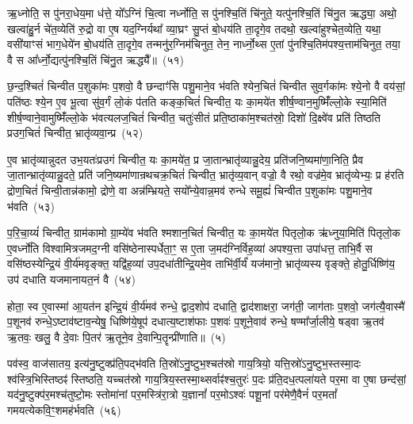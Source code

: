 ऋ॒ध्नोति॒ स पु॑नरा॒धेय॒मा ध॑त्ते॒ यो᳚\-ऽग्निं चि॒त्वा नर्ध्नोति॒ स पु॑नश्चि॒तिं चि॑नुते॒ यत्पु॑नश्चि॒तिं चि॑नु॒त ऋद्ध्या॒ अथो॒ खल्वा॑हु॒र्न चे॑त॒व्येति॑ रु॒द्रो वा ए॒ष यद॒ग्निर्यथा᳚ व्या॒घ्रꣳ सु॒प्तं बो॒धय॑ति ता॒दृगे॒व तदथो॒ खल्वा॑हुश्चेत॒व्येति॒ यथा॒ वसी॑याꣳसं भाग॒धेये॑न बो॒धय॑ति ता॒दृगे॒व तन्मनु॑र॒ग्निम॑चिनुत॒ तेन॒ नार्ध्नो॒थ्स ए॒तां पु॑नश्चि॒तिम॑पश्य॒त्ताम॑चिनुत॒ तया॒ वै स आ᳚र्ध्नो॒द्यत्पु॑नश्चि॒तिं चि॑नु॒त ऋद्ध्यै᳚॥~(५१)

{\anuvakamend[{त्रि॒वृदथ॒ तिष्ठ॑न्त्यग्न्या॒धेये॑न॒ नाचि॑नुत स॒प्तद॑श च}]}%

छ॒न्द॒श्चितं॑ चिन्वीत प॒शुका॑मः प॒शवो॒ वै छन्दाꣳ॑सि पशु॒माने॒व भ॑वति श्येन॒चितं॑ चिन्वीत सुव॒र्गका॑मः श्ये॒नो वै वय॑सां॒ पति॑ष्ठः श्ये॒न ए॒व भू॒त्वा सु॑व॒र्गं लो॒कं प॑तति कङ्क॒चितं॑ चिन्वीत॒ यः का॒मये॑त शीर्\mbox{}ष॒ण्वान॒मुष्मिँ॑ल्लो॒के स्या॒मिति॑ शीर्\mbox{}ष॒ण्वाने॒वामुष्मिँ॑ल्लो॒के भ॑वत्यलज॒चितं॑ चिन्वीत॒ चतुः॑सीतं प्रति॒ष्ठाका॑म॒श्चत॑स्रो॒ दिशो॑ दि॒क्ष्वे॑व प्रति॑ तिष्ठति प्रउग॒चितं॑ चिन्वीत॒ भ्रातृ॑व्यवा॒न्प्र~(५२)

ए॒व भ्रातृ॑व्यान्नुदत उभ॒यतः॑प्रउगं चिन्वीत॒ यः का॒मये॑त॒ प्र जा॒तान्भ्रातृ॑व्यान्नु॒देय॒ प्रति॑जनि॒ष्यमा॑णा॒निति॒ प्रैव जा॒तान्भ्रातृ॑व्यान्नु॒दते॒ प्रति॑ जनि॒ष्यमा॑णान्रथचक्र॒चितं॑ चिन्वीत॒ भ्रातृ॑व्य॒वान् वज्रो॒ वै रथो॒ वज्र॑मे॒व भ्रातृ॑व्येभ्यः॒ प्र ह॑रति द्रोण॒चितं॑ चिन्वी॒तान्न॑कामो॒ द्रोणे॒ वा अन्न॑म्भ्रियते॒ सयो᳚न्ये॒वान्न॒मव॑ रुन्धे समू॒ह्यं॑ चिन्वीत प॒शुका॑मः पशु॒माने॒व भ॑वति~(५३)

प॒रि॒चा॒य्यं॑ चिन्वीत॒ ग्राम॑कामो ग्रा॒म्ये॑व भ॑वति श्मशान॒चितं॑ चिन्वीत॒ यः का॒मये॑त पितृलो॒क ऋ॑ध्नुया॒मिति॑ पितृलो॒क ए॒वर्ध्नो॑ति विश्वामित्रजमद॒ग्नी वसि॑ष्ठेनास्पर्धेता॒ꣳ॒ स ए॒ता ज॒मद॑ग्निर्विह॒व्या॑ अपश्य॒त्ता उपा॑धत्त॒ ताभि॒र्वै स वसि॑ष्ठस्येन्द्रि॒यं वी॒र्य॑मवृङ्क्त॒ यद्वि॑ह॒व्या॑ उप॒दधा॑तीन्द्रि॒यमे॒व ताभि॑र्वी॒र्यं॑ यज॑मानो॒ भ्रातृ॑व्यस्य वृङ्क्ते॒ होतु॒र्धिष्णि॑य॒ उप॑ दधाति यजमानायत॒नं वै~(५४)

होता॒ स्व ए॒वास्मा॑ आ॒यत॑न इन्द्रि॒यं वी॒र्य॑मव॑ रुन्धे॒ द्वाद॒शोप॑ दधाति॒ द्वाद॑शाक्षरा॒ जग॑ती॒ जाग॑ताः प॒शवो॒ जग॑त्यै॒वास्मै॑ प॒शूनव॑ रुन्धे॒\-ऽष्टाव॑ष्टाव॒न्येषु॒ धिष्णि॑ये॒षूप॑ दधात्य॒ष्टाश॑फाः प॒शवः॑ प॒शूने॒वाव॑ रुन्धे॒ षण्मा᳚र्जा॒लीये॒ षड्वा ऋ॒तव॑ ऋ॒तवः॒ खलु॒ वै दे॒वाः पि॒तर॑ ऋ॒तूने॒व दे॒वान्पि॒तॄन्प्री॑णाति॥~(५)

{}%

पव॑स्व॒ वाज॑सातय॒ इत्य॑नु॒ष्टुक्प्र॑ति॒पद्भ॑वति ति॒स्रो॑\-ऽनु॒ष्टुभ॒श्चत॑स्रो गाय॒त्रियो॒ यत्ति॒स्रो॑\-ऽनु॒ष्टुभ॒स्तस्मा॒दः श्व॑स्त्रि॒भिस्तिष्ठꣴ॑ स्तिष्ठति॒ यच्चत॑स्रो गाय॒त्रिय॒स्तस्मा॒थ्सर्वाꣴ॑श्च॒तुरः॑ प॒दः प्र॑ति॒दध॒त्पला॑यते पर॒मा वा ए॒षा छन्द॑सां॒ यद॑नु॒ष्टुक्प॑र॒मश्च॑तुष्टो॒मः स्तोमा॑नां पर॒मस्त्रि॑रा॒त्रो य॒ज्ञानां᳚ पर॒मो\-ऽश्वः॑ पशू॒नां पर॑मेणै॒वैनं॑ पर॒मतां᳚ गमयत्येकवि॒ꣳ॒शमह॑र्भवति~(५६)

